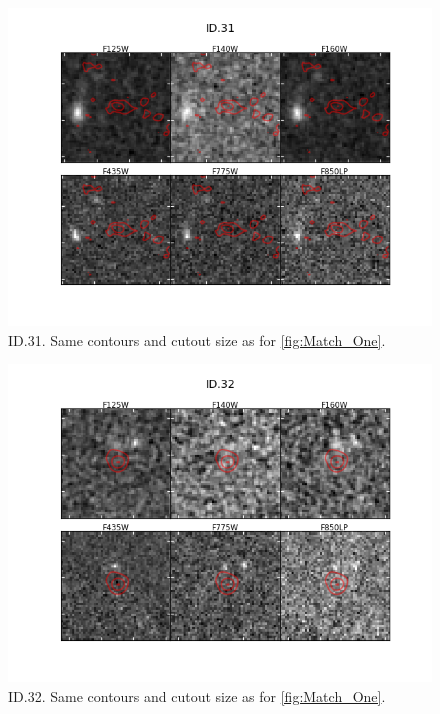 \begin{figure}[tbp]
\centering \includegraphics[width=160mm]{Matched/ASPECS_Cutout_30.png}
\caption{ID.31. Same contours and cutout size as for \ref{fig:Match_One}.}
\label{fig:Match_Three}
\end{figure}

\begin{figure}[tbp]
\centering \includegraphics[width=160mm]{Matched/ASPECS_Cutout_31.png}
\caption{ID.32. Same contours and cutout size as for \ref{fig:Match_One}.}
\label{fig:Match_Three}
\end{figure}

